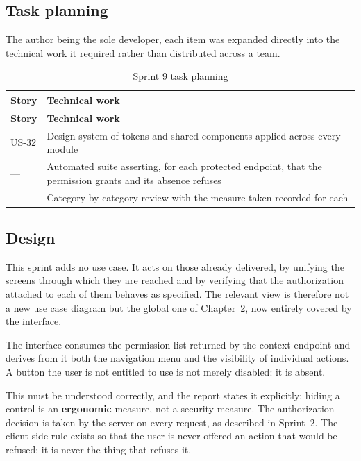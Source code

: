 \subsection{Task planning}
The author being the sole developer, each item was expanded directly into the technical work it
required rather than distributed across a team.

\begin{longtable}{|m{1.6cm}|m{12.4cm}|}
\caption{Sprint 9 task planning}\label{tab:tp9}\\
\hline
\textbf{Story} & \textbf{Technical work} \\
\hline
\endfirsthead
\hline
\textbf{Story} & \textbf{Technical work} \\
\hline
\endhead
\endfoot
\endlastfoot
\hline
US-32 & Design system of tokens and shared components applied across every module \\
\hline
--- & Automated suite asserting, for each protected endpoint, that the permission grants and its absence refuses \\
\hline
--- & Category-by-category review with the measure taken recorded for each \\
\hline
\end{longtable}

\subsection{Design}
This sprint adds no use case. It acts on those already delivered, by unifying the screens through
which they are reached and by verifying that the authorization attached to each of them behaves as
specified. The relevant view is therefore not a new use case diagram but the global one of
Chapter~2, now entirely covered by the interface.

The interface consumes the permission list returned by the context endpoint and derives from it both
the navigation menu and the visibility of individual actions. A button the user is not entitled to
use is not merely disabled: it is absent.

This must be understood correctly, and the report states it explicitly: hiding a control is an
\textbf{ergonomic} measure, not a security measure. The authorization decision is taken by the
server on every request, as described in Sprint~2. The client-side rule exists so that the user is
never offered an action that would be refused; it is never the thing that refuses it.

